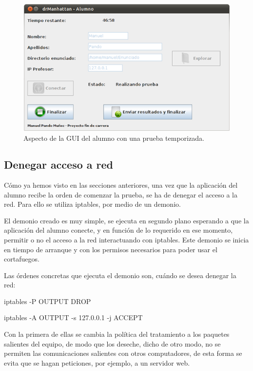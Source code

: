 \begin{figure}
    \centering
    \includegraphics[width=.90\linewidth]{iteracion2/tiempoRestante}
    \caption{Aspecto de la GUI del alumno con una prueba temporizada.}
    \label{fig:iteracion2:tiempoRestante}
\end{figure}


\subsection{Denegar acceso a red}
\label{sec:iteracion2:denegarRed}

Cómo ya hemos visto en las secciones anteriores, una vez que la aplicación del alumno recibe la orden de comenzar la prueba, se ha de denegar el acceso a la red. Para ello se utiliza iptables, por medio de un demonio.
\newline

El demonio creado es muy simple, se ejecuta en segundo plano esperando a que la aplicación del alumno conecte, y en función de lo requerido en ese momento, permitir o no el acceso a la red interactuando con iptables. Este demonio se inicia en tiempo de arranque y con los permisos necesarios para poder usar el cortafuegos.
\newline

Las órdenes concretas que ejecuta el demonio son, cuándo se desea denegar la red:

\begin{center}

    iptables -P OUTPUT DROP

    iptables -A OUTPUT -s 127.0.0.1 -j ACCEPT

\end{center}

Con la primera de ellas se cambia la política del tratamiento a los paquetes salientes del equipo, de modo que los deseche, dicho de otro modo, no se permiten las comunicaciones salientes con otros computadores, de esta forma se evita que se hagan peticiones, por ejemplo, a un servidor web\cite{WEB:1996}.
\newline

